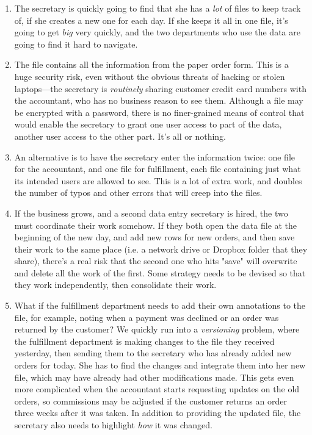 \documentclass[11pt]{book}
\newcommand{\term}[1]{\emph{#1}} %
\begin{document}
\begin{enumerate}
    \item The secretary is quickly going to find that she has a \emph{lot} of files to keep track of, if she creates a new one for each day.  If she keeps it all in one file, it's going to get \emph{big} very quickly, and the two departments who use the data are going to find it hard to navigate.
    \item The file contains all the information from the paper order form.  This is a huge security risk, even without the obvious threats of hacking or stolen laptops---the secretary is \emph{routinely} sharing customer credit card numbers with the accountant, who has no business reason to see them.  Although a file may be encrypted with a password, there is no finer-grained means of control that would enable the secretary to grant one user access to part of the data, another user access to the other part.  It's all or nothing.
    \item An alternative is to have the secretary enter the information twice: one file for the accountant, and one file for fulfillment, each file containing just what its intended users are allowed to see.  This is a lot of extra work, and doubles the number of typos and other errors that will creep into the files.
    \item If the business grows, and a second data entry secretary is hired, the two must coordinate their work somehow.  If they both open the data file at the beginning of the new day, and add new rows for new orders, and then save their work to the same place (i.e. a network drive or Dropbox folder that they share), there's a real risk that the second one who hits "save" will overwrite and delete all the work of the first.  Some strategy needs to be devised so that they work independently, then consolidate their work.
    \item What if the fulfillment department needs to add their own annotations to the file, for example, noting when a payment was declined or an order was returned by the customer?  We quickly run into a \term{versioning} problem, where the fulfillment department is making changes to the file they received yesterday, then sending them to the secretary who has already added new orders for today.  She has to find the changes and integrate them into her new file, which may have already had other modifications made.  This gets even more complicated when the accountant starts requesting updates on the old orders, so commissions may be adjusted if the customer returns an order three weeks after it was taken.  In addition to providing the updated file, the secretary also needs to highlight \emph{how} it was changed.

\end{enumerate}
\end{document}
